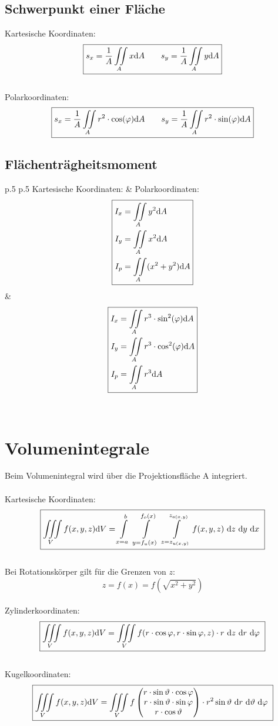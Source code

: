 \subsection{Schwerpunkt einer Fläche}
Kartesische Koordinaten:
\[\boxed{
	s_x=\frac{1}{A}\iint\limits_{A} x \mathrm{d} A \qquad
	s_y=\frac{1}{A}\iint\limits_{A} y \mathrm{d} A
}\]
\\
Polarkoordinaten:
\[\boxed{
	s_x=\frac{1}{A}\iint\limits_{A} r^2 \cdot \cos(\varphi) \mathrm{d} A \qquad
	s_y=\frac{1}{A}\iint\limits_{A} r^2 \cdot \sin(\varphi) \mathrm{d} A
}\]

\subsection{Flächenträgheitsmoment}
\begin{tabular}{p{.5\linewidth} p{.5\linewidth}}
	Kartesische Koordinaten:	&	Polarkoordinaten: \\
	\[\boxed{\begin{aligned}
		I_x &= \iint\limits_A y^2 \mathrm{d} A\\
		I_y &= \iint\limits_A x^2 \mathrm{d} A\\
		I_{p}&=\iint\limits_A (x^2+y^2) \mathrm{d} A
	\end{aligned}}\]	
	&	
	\[\boxed{\begin{aligned}
		I_x &= \iint\limits_A r^3 \cdot \sin^2(\varphi) \mathrm{d} A\\
		I_y &= \iint\limits_A r^3 \cdot \cos^2(\varphi) \mathrm{d} A\\
		I_{p}&=\iint\limits_A r^3 \mathrm{d} A
	\end{aligned}}\]
\end{tabular}
\\

\section{Volumenintegrale}
Beim Volumenintegral wird über die Projektionsfläche A integriert.\\
\\
Kartesische Koordinaten:
\[\boxed{
	\iiint\limits_V f(x,y,z) \di V = 
	\int\limits_{x=a}^{b}\ 
	\int\limits_{y=f_u(x)}^{f_o(x)}\  \int\limits_{z=z_{u(x,y)}}^{z_{o(x,y)}}
	f(x,y,z)\ \di z\ \di y\ \di x\
}\]
\\
Bei Rotationskörper gilt für die Grenzen von $z$:\\
\[
	z = f(x) = f(\sqrt{x^2 + y^2})
\]
\\
Zylinderkoordinaten:
\[\boxed{
	\iiint\limits_V f(x,y,z) \mathrm{d} V = 
	\iiint\limits_V	f(r \cdot \cos\varphi,r \cdot \sin\varphi,z) \cdot r\ \mathrm{d} z\ \mathrm{d} r\ \mathrm{d} \varphi\
}\]
\\
Kugelkoordinaten:
\[\boxed{
	\iiint\limits_V f(x,y,z) \di V = 
	\iiint\limits_V	
	f\left(\begin{matrix}
	r \cdot \sin\vartheta \cdot \cos\varphi\\
	r \cdot \sin\vartheta \cdot \sin\varphi\\
	r \cdot \cos\vartheta
	\end{matrix}\right) \cdot r^2\sin\vartheta\ \di r\ \di \vartheta\ \di \varphi\
}\]
\\

